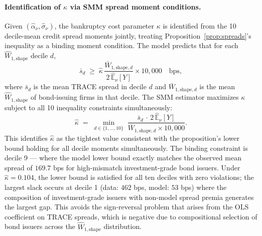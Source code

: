 \paragraph{Identification of $\kappa$ via SMM spread moment conditions.}
Given $(\hat{\alpha}_\nu, \hat{\sigma}_\nu)$, the bankruptcy cost parameter $\kappa$ is identified from the 10 decile-mean credit spread moments jointly, treating Proposition~\ref{prop:spreads}'s inequality as a binding moment condition. The model predicts that for each $\widehat{W}_{1,\text{shape}}$ decile $d$,
\begin{equation}
  \bar{s}_d \;\geq\; \hat{\kappa}\,\frac{\bar{W}_{1,\text{shape},d}}{2\,\hat{\mathbb{E}}_\nu[Y]}\times 10{,}000\quad\text{bps},
  \label{eq:smm_moment}
\end{equation}
where $\bar{s}_d$ is the mean TRACE spread in decile $d$ and $\bar{W}_{1,\text{shape},d}$ is the mean $\widehat{W}_{1,\text{shape}}$ of bond-issuing firms in that decile. The SMM estimator maximizes $\kappa$ subject to all 10 inequality constraints simultaneously:
\begin{equation}
  \hat{\kappa} \;=\; \min_{d\in\{1,\ldots,10\}}\;\frac{\bar{s}_d\,\cdot\,2\,\hat{\mathbb{E}}_\nu[Y]}{\bar{W}_{1,\text{shape},d}\times 10{,}000}.
  \label{eq:kappa_smm}
\end{equation}
This identifies $\hat{\kappa}$ as the tightest value consistent with the proposition's lower bound holding for all decile moments simultaneously. The binding constraint is decile 9 --- where the model lower bound exactly matches the observed mean spread of $169.7$ bps for high-mismatch investment-grade bond issuers. Under $\hat{\kappa}=0.104$, the lower bound is satisfied for all ten deciles with zero violations; the largest slack occurs at decile 1 (data: $462$ bps, model: $53$ bps) where the composition of investment-grade issuers with non-model spread premia generates the largest gap. This avoids the sign-reversal problem that arises from the OLS coefficient on TRACE spreads, which is negative due to compositional selection of bond issuers across the $\widehat{W}_{1,\text{shape}}$ distribution.

